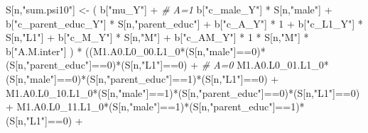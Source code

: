 \documentclass[
]{book}
\newenvironment{Shaded}{\begin{snugshade}}{\end{snugshade}}
\newcommand{\CommentTok}[1]{\textcolor[rgb]{0.56,0.35,0.01}{\textit{#1}}}
\newcommand{\DecValTok}[1]{\textcolor[rgb]{0.00,0.00,0.81}{#1}}
\newcommand{\NormalTok}[1]{#1}
\newcommand{\OtherTok}[1]{\textcolor[rgb]{0.56,0.35,0.01}{#1}}
\newcommand{\SpecialCharTok}[1]{\textcolor[rgb]{0.00,0.00,0.00}{#1}}
\newcommand{\StringTok}[1]{\textcolor[rgb]{0.31,0.60,0.02}{#1}}
\begin{document}
\begin{Shaded}
\begin{Highlighting}[]
\NormalTok{    S[n,}\StringTok{"sum.psi10"}\NormalTok{] }\OtherTok{\textless{}{-}}\NormalTok{  ( b[}\StringTok{"mu\_Y"}\NormalTok{] }\SpecialCharTok{+}                                          \CommentTok{\# A=1}
\NormalTok{                             b[}\StringTok{"c\_male\_Y"}\NormalTok{] }\SpecialCharTok{*}\NormalTok{ S[n,}\StringTok{"male"}\NormalTok{] }\SpecialCharTok{+} 
\NormalTok{                             b[}\StringTok{"c\_parent\_educ\_Y"}\NormalTok{] }\SpecialCharTok{*}\NormalTok{ S[n,}\StringTok{"parent\_educ"}\NormalTok{] }\SpecialCharTok{+} 
\NormalTok{                             b[}\StringTok{"c\_A\_Y"}\NormalTok{] }\SpecialCharTok{*} \DecValTok{1} \SpecialCharTok{+}
\NormalTok{                             b[}\StringTok{"c\_L1\_Y"}\NormalTok{] }\SpecialCharTok{*}\NormalTok{ S[n,}\StringTok{"L1"}\NormalTok{] }\SpecialCharTok{+}
\NormalTok{                             b[}\StringTok{"c\_M\_Y"}\NormalTok{] }\SpecialCharTok{*}\NormalTok{ S[n,}\StringTok{"M"}\NormalTok{] }\SpecialCharTok{+}
\NormalTok{                             b[}\StringTok{"c\_AM\_Y"}\NormalTok{] }\SpecialCharTok{*} \DecValTok{1} \SpecialCharTok{*}\NormalTok{ S[n,}\StringTok{"M"}\NormalTok{] }\SpecialCharTok{*}\NormalTok{ b[}\StringTok{"A.M.inter"}\NormalTok{] ) }\SpecialCharTok{*}
\NormalTok{      ((M1.A0.L0\_00.L1\_0}\SpecialCharTok{*}\NormalTok{(S[n,}\StringTok{"male"}\NormalTok{]}\SpecialCharTok{==}\DecValTok{0}\NormalTok{)}\SpecialCharTok{*}\NormalTok{(S[n,}\StringTok{"parent\_educ"}\NormalTok{]}\SpecialCharTok{==}\DecValTok{0}\NormalTok{)}\SpecialCharTok{*}\NormalTok{(S[n,}\StringTok{"L1"}\NormalTok{]}\SpecialCharTok{==}\DecValTok{0}\NormalTok{) }\SpecialCharTok{+} \CommentTok{\# A\textquotesingle{}=0}
\NormalTok{          M1.A0.L0\_01.L1\_0}\SpecialCharTok{*}\NormalTok{(S[n,}\StringTok{"male"}\NormalTok{]}\SpecialCharTok{==}\DecValTok{0}\NormalTok{)}\SpecialCharTok{*}\NormalTok{(S[n,}\StringTok{"parent\_educ"}\NormalTok{]}\SpecialCharTok{==}\DecValTok{1}\NormalTok{)}\SpecialCharTok{*}\NormalTok{(S[n,}\StringTok{"L1"}\NormalTok{]}\SpecialCharTok{==}\DecValTok{0}\NormalTok{) }\SpecialCharTok{+}
\NormalTok{          M1.A0.L0\_10.L1\_0}\SpecialCharTok{*}\NormalTok{(S[n,}\StringTok{"male"}\NormalTok{]}\SpecialCharTok{==}\DecValTok{1}\NormalTok{)}\SpecialCharTok{*}\NormalTok{(S[n,}\StringTok{"parent\_educ"}\NormalTok{]}\SpecialCharTok{==}\DecValTok{0}\NormalTok{)}\SpecialCharTok{*}\NormalTok{(S[n,}\StringTok{"L1"}\NormalTok{]}\SpecialCharTok{==}\DecValTok{0}\NormalTok{) }\SpecialCharTok{+} 
\NormalTok{          M1.A0.L0\_11.L1\_0}\SpecialCharTok{*}\NormalTok{(S[n,}\StringTok{"male"}\NormalTok{]}\SpecialCharTok{==}\DecValTok{1}\NormalTok{)}\SpecialCharTok{*}\NormalTok{(S[n,}\StringTok{"parent\_educ"}\NormalTok{]}\SpecialCharTok{==}\DecValTok{1}\NormalTok{)}\SpecialCharTok{*}\NormalTok{(S[n,}\StringTok{"L1"}\NormalTok{]}\SpecialCharTok{==}\DecValTok{0}\NormalTok{) }\SpecialCharTok{+}

\end{Highlighting}
\end{Shaded}
\end{document}
